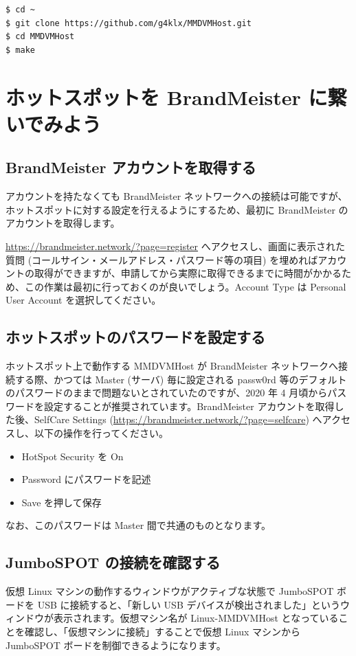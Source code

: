 \documentclass[a4j,oneside]{ujbook}
\begin{document}
\begin{verbatim}
$ cd ~
$ git clone https://github.com/g4klx/MMDVMHost.git
$ cd MMDVMHost
$ make
\end{verbatim}

\chapter{ホットスポットを BrandMeister に繋いでみよう}

\section{BrandMeister アカウントを取得する}
アカウントを持たなくても BrandMeister ネットワークへの接続は可能ですが、ホットスポットに対する設定を行えるようにするため、最初に BrandMeister のアカウントを取得します。

\url{https://brandmeister.network/?page=register} へアクセスし、画面に表示された質問 (コールサイン・メールアドレス・パスワード等の項目) を埋めればアカウントの取得ができますが、申請してから実際に取得できるまでに時間がかかるため、この作業は最初に行っておくのが良いでしょう。Account Type は Personal User Account を選択してください。

\section{ホットスポットのパスワードを設定する}

ホットスポット上で動作する MMDVMHost が BrandMeister ネットワークへ接続する際、かつては Master (サーバ) 毎に設定される passw0rd 等のデフォルトのパスワードのままで問題ないとされていたのですが、2020 年 4 月頃からパスワードを設定することが推奨されています。BrandMeister アカウントを取得した後、SelfCare Settings (\url{https://brandmeister.network/?page=selfcare}) へアクセスし、以下の操作を行ってください。
\begin{itemize}
 \item HotSpot Security を On
 \item Password にパスワードを記述
 \item Save を押して保存
\end{itemize}
なお、このパスワードは Master 間で共通のものとなります。

\section{JumboSPOT の接続を確認する}

仮想 Linux マシンの動作するウィンドウがアクティブな状態で JumboSPOT ボードを USB に接続すると、「新しい USB デバイスが検出されました」というウィンドウが表示されます。仮想マシン名が Linux-MMDVMHost となっていることを確認し、「仮想マシンに接続」することで仮想 Linux マシンから JumboSPOT ボードを制御できるようになります。
\end{document}

